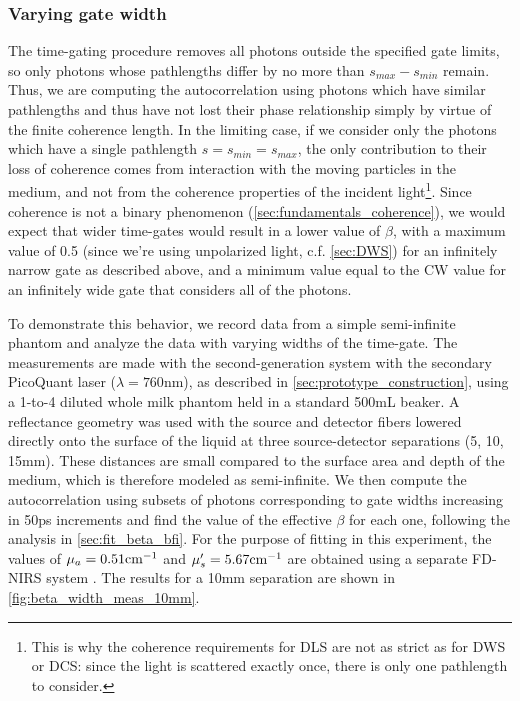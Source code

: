 \subsubsection{Varying gate width}
The time-gating procedure removes all photons outside the specified gate limits, so only photons whose pathlengths differ by no more than $s_{max}-s_{min}$ remain. Thus, we are computing the autocorrelation using photons which have similar pathlengths and thus have not lost their phase relationship simply by virtue of the finite coherence length. In the limiting case, if we consider only the photons which have a single pathlength $s=s_{min}=s_{max}$, the only contribution to their loss of coherence comes from interaction with the moving particles in the medium, and not from the coherence properties of the incident light\footnote{This is why the coherence requirements for DLS are not as strict as for DWS or DCS: since the light is scattered exactly once, there is only one pathlength to consider.}. Since coherence is not a binary phenomenon (\autoref{sec:fundamentals_coherence}), we would expect that wider time-gates would result in a lower value of $\beta$, with a maximum value of 0.5 (since we're using unpolarized light, c.f. \autoref{sec:DWS}) for an infinitely narrow gate as described above, and a minimum value equal to the CW value for an infinitely wide gate that considers all of the photons. 

To demonstrate this behavior, we record data from a simple semi-infinite phantom and analyze the data with varying widths of the time-gate. The measurements are made with the second-generation system with the secondary PicoQuant laser ($\lambda=760$nm), as described in \autoref{sec:prototype_construction}, using a 1-to-4 diluted whole milk phantom held in a standard 500mL beaker. A reflectance geometry was used with the source and detector fibers lowered directly onto the surface of the liquid at three source-detector separations (5, 10, 15mm). These distances are small compared to the surface area and depth of the medium, which is therefore modeled as semi-infinite. We then compute the autocorrelation using subsets of photons corresponding to gate widths increasing in 50ps increments and find the value of the effective $\beta$ for each one, following the analysis in \autoref{sec:fit_beta_bfi}. For the purpose of fitting in this experiment, the values of $\mu_a=0.51\textnormal{cm}^{-1}$ and $\mu_s'=5.67\textnormal{cm}^{-1}$ are obtained using a separate FD-NIRS system \cite{MetaOx}. The results for a 10mm separation are shown in \autoref{fig:beta_width_meas_10mm}. 


